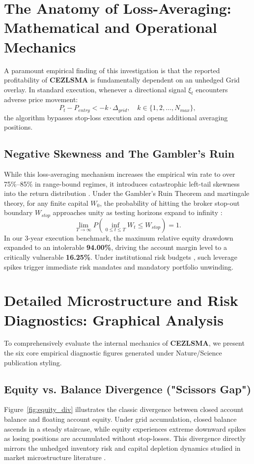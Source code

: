 \documentclass[11pt,a4paper]{article}
\begin{document}
\section{The Anatomy of Loss-Averaging: Mathematical and Operational Mechanics}
A paramount empirical finding of this investigation is that the reported profitability of \textbf{CEZLSMA} is fundamentally dependent on an unhedged Grid overlay. In standard execution, whenever a directional signal $\xi_t$ encounters adverse price movement:
\begin{equation}
P_t - P_{entry} < -k \cdot \Delta_{grid}, \quad k \in \{1, 2, \dots, N_{max}\},
\end{equation}
the algorithm bypasses stop-loss execution and opens additional averaging positions. 

\subsection{Negative Skewness and The Gambler's Ruin}
While this loss-averaging mechanism increases the empirical win rate to over 75\%--85\% in range-bound regimes, it introduces catastrophic left-tail skewness into the return distribution \cite{bouchaud2003theory, cont2001empirical}. Under the Gambler's Ruin Theorem and martingale theory, for any finite capital $W_0$, the probability of hitting the broker stop-out boundary $W_{stop}$ approaches unity as testing horizons expand to infinity \cite{bouchaud2009markets}:
\begin{equation}
\lim_{T \to \infty} P\left(\inf_{0 \le t \le T} W_t \le W_{stop}\right) = 1.
\end{equation}
In our 3-year execution benchmark, the maximum relative equity drawdown expanded to an intolerable \textbf{94.00\%}, driving the account margin level to a critically vulnerable \textbf{16.25\%}. Under institutional risk budgets \cite{rockafellar2000optimization, shleifer1997limits}, such leverage spikes trigger immediate risk mandates and mandatory portfolio unwinding.


\section{Detailed Microstructure and Risk Diagnostics: Graphical Analysis}
To comprehensively evaluate the internal mechanics of \textbf{CEZLSMA}, we present the six core empirical diagnostic figures generated under Nature/Science publication styling.

\subsection{Equity vs. Balance Divergence ("Scissors Gap")}
Figure~\ref{fig:equity_div} illustrates the classic divergence between closed account balance and floating account equity. Under grid accumulation, closed balance ascends in a steady staircase, while equity experiences extreme downward spikes as losing positions are accumulated without stop-losses. This divergence directly mirrors the unhedged inventory risk and capital depletion dynamics studied in market microstructure literature \cite{shleifer1997limits, bouchaud2009markets}.
\end{document}
